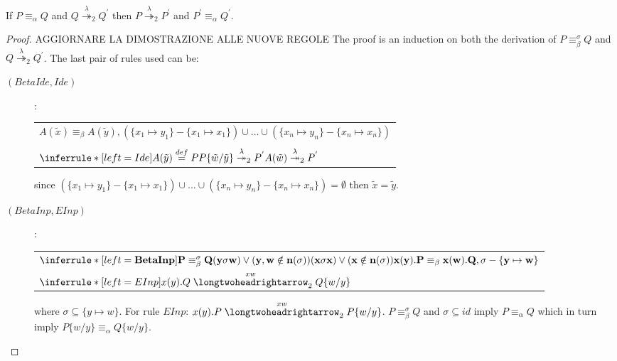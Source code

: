 \begin{lemma}
  If $P\equiv_{\alpha} Q$ and $Q\stackrel{\lambda}{\twoheadrightarrow}_{2} Q^{'}$ then $P\stackrel{\lambda}{\twoheadrightarrow}_{2} P^{'}$ and $P^{'}\equiv_{\alpha} Q^{'}$.
  \begin{proof}AGGIORNARE LA DIMOSTRAZIONE ALLE NUOVE REGOLE
    The proof is an induction on both the derivation of $P\equiv_{\beta}^{\sigma} Q$ and $Q\stackrel{\lambda}{\twoheadrightarrow}_{2} Q^{'}$. The last pair of rules used can be:
    \begin{description}
      \item[$(BetaIde, Ide)$]:
	\begin{center}
	  \begin{tabular}{l}
	      $A(\tilde{x})\equiv_{\beta}A(\tilde{y}), (\{x_{1}\mapsto y_{1}\}-\{x_{1}\mapsto x_{1}\}) \cup \ldots \cup (\{x_{n}\mapsto y_{n}\}-\{x_{n}\mapsto x_{n}\})$	
	    \\\\
	      $\inferrule*[left=Ide]{
		  A(\tilde{y}) \stackrel{def}{=} P
		\\
		  P\{\tilde{w}/\tilde{y}\} \stackrel{\lambda}{\twoheadrightarrow}_{2} P^{'}
	      }{
		  A(\tilde{w}) \stackrel{\lambda}{\twoheadrightarrow}_{2} P^{'}
	      }$	      
	  \\
	  \end{tabular}
	\end{center}
	since $(\{x_{1}\mapsto y_{1}\}-\{x_{1}\mapsto x_{1}\}) \cup \ldots \cup (\{x_{n}\mapsto y_{n}\}-\{x_{n}\mapsto x_{n}\})=\emptyset$ then $\tilde{x}=\tilde{y}$.
      \item[$(BetaInp, EInp)$]:
	\begin{center}
	  \begin{tabular}{l}
	      $\inferrule*[left=\bf{BetaInp}]{
		  P\equiv_{\beta}^{\sigma}Q
		\\
		  (y\sigma w) \vee (y,w\notin n(\sigma))
		\\
		  (x\sigma x) \vee (x\notin n(\sigma))
	      }{
		  x(y).P\equiv_{\beta}x(w).Q,
		\\
		  \sigma- \{y\mapsto w\}
	      }$
	    \\
	      $\inferrule*[left=EInp]{
	      }{
		  x(y).Q \stackrel{xw}{\longtwoheadrightarrow}_{2} Q\{w/y\}
	      }$	      
	  \\
	  \end{tabular}
	\end{center}
	where $\sigma \subseteq \{y\mapsto w\}$. For rule $EInp$: $x(y).P \stackrel{xw}{\longtwoheadrightarrow}_{2} P\{w/y\}$. $P\equiv_{\beta}^{\sigma}Q$ and $\sigma\subseteq id$ imply $P\equiv_{\alpha}Q$ which in turn imply $P\{w/y\} \equiv_{\alpha} Q\{w/y\}$.

\end{description}
\end{proof}
\end{lemma}
